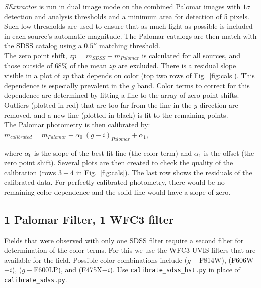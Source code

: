 \documentclass{article}
\begin{document}
\noindent \textit{SExtractor} is run in dual image mode
on the combined Palomar images with 
$1\sigma$ detection and analysis thresholds and a minimum area for 
detection of 5 pixels. Such low thresholds are used to ensure that as much
light as possible is included in each source's automatic magnitude. The 
Palomar catalogs are then match with the SDSS catalog using a $0.5''$
matching threshold. \\

\noindent The zero point shift, $zp = m_{SDSS} - m_{Palomar}$ 
is calculated for all sources, and those outside of $68\%$ of the
mean $zp$ are excluded. There is a residual slope visible in a plot of 
$zp$ that depends on color (top two rows of Fig.~\ref{fig:cals}).
This dependence is especially prevalent in the $g$ band.
Color terms to correct for this dependence 
are determined by fitting a line to the array of 
zero point shifts. Outliers (plotted in red) that are too far from the 
line in the 
$y$-direction are removed, and a new line (plotted in black) 
is fit to the remaining points. \\

\noindent The Palomar photometry is then calibrated by:\\
\indent $m_{calibrated} = m_{Palomar} + \alpha_0~(g-i)_{Palomar} + \alpha_1$,

\noindent where $\alpha_0$ is the slope of the best-fit line (the color term)
and $\alpha_1$ is the offset (the zero point shift). Several plots
are then created to check the quality of the calibration (rows $3-4$ in 
Fig.~\ref{fig:cals}). The last row shows the residuals of the calibrated 
data. For perfectly calibrated photometry, there would be no remaining
color dependence and the solid line would have a slope of zero.

\subsection{1 Palomar Filter, 1 WFC3 filter}
Fields that were observed with only one SDSS filter require a second
filter for determination of the color terms. For this we use the WFC3
UVIS filters that are available for the field. Possible color combinations
include ($g-$F814W), (F606W$-i$), ($g-$F600LP), and (F475X$-i$).
Use \texttt{calibrate\_sdss\_hst.py} in place of 
\texttt{calibrate\_sdss.py}.
\end{document}
